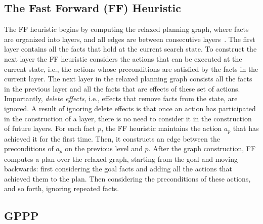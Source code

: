 \documentclass[letterpaper]{article}
\theoremstyle{definition}
\begin{document}
\subsection{The Fast Forward (FF) Heuristic}
The FF heuristic begins by computing the relaxed planning graph, where facts are organized into layers, and all edges are between consecutive layers~\citep{hoffmann2001ff}. The first layer contains all the facts that hold at the current search state. To construct the next layer the FF heuristic considers the actions that can be executed at the current state, i.e., the actions whose preconditions are satisfied by the facts in the current layer. The next layer in the relaxed planning graph consists all the facts in the previous layer and all the facts that are effects of these set of actions. Importantly, {\em delete effects}, i.e., effects that remove facts from the state, are ignored. A result of ignoring delete effects 
is that once an action has participated in the construction of a layer, there is no need to consider it in the construction of future layers. For each fact $p$, the FF heuristic maintains the action $a_p$ that has achieved it for the first time. Then, it constructs an edge between the preconditions of $a_p$ on the previous level and $p$. After the graph construction, FF computes a plan over the relaxed graph, starting from the goal and moving backwards: first considering the goal facts and adding all the actions that achieved them to the plan. Then considering the preconditions of these actions, and so forth, ignoring repeated facts.

\subsection{GPPP}

\end{document}
